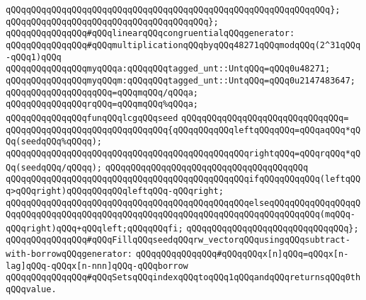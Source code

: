 \verb|qQQqqQQqqQQqqQQqqQQqqQQqqQQqqQQqqQQqqQQqqQQqqQQqqQQqqQQqqQQqqQQq};|\newline
\verb|qQQqqQQqqQQqqQQqqQQqqQQqqQQqqQQqqQQqqQQq};|\newline
\newline
\verb|qQQqqQQqqQQqqQQq#qQQqlinearqQQqcongruentialqQQqgenerator:|\newline
\verb|qQQqqQQqqQQqqQQq#qQQqmultiplicationqQQqbyqQQq48271qQQqmodqQQq(2^31qQQq-qQQq1)qQQq|\newline
\newline
\verb|qQQqqQQqqQQqqQQqmyqQQqa:qQQqqQQqtagged_unt::UntqQQq=qQQq0u48271;|\newline
\verb|qQQqqQQqqQQqqQQqmyqQQqm:qQQqqQQqtagged_unt::UntqQQq=qQQq0u2147483647;|\newline
\newline
\verb|qQQqqQQqqQQqqQQqqqQQq=qQQqmqQQq/qQQqa;|\newline
\verb|qQQqqQQqqQQqqQQqrqQQq=qQQqmqQQq%qQQqa;|\newline
\newline
\verb|qQQqqQQqqQQqqQQqfunqQQqlcgqQQqseed|\newline
\verb|qQQqqQQqqQQqqQQqqQQqqQQqqQQqqQQq=|\newline
\verb|qQQqqQQqqQQqqQQqqQQqqQQqqQQqqQQq{qQQqqQQqqQQqleftqQQqqQQq=qQQqaqQQq*qQQq(seedqQQq%qQQqq);|\newline
\verb|qQQqqQQqqQQqqQQqqQQqqQQqqQQqqQQqqQQqqQQqqQQqqQQqrightqQQq=qQQqrqQQq*qQQq(seedqQQq/qQQqq);|\newline
\verb|qQQqqQQqqQQqqQQqqQQqqQQqqQQqqQQqqQQqqQQq|\newline
\verb|qQQqqQQqqQQqqQQqqQQqqQQqqQQqqQQqqQQqqQQqqQQqqQQqifqQQqqQQqqQQq(leftqQQq>qQQqright)qQQqqQQqqQQqleftqQQq-qQQqright;|\newline
\verb|qQQqqQQqqQQqqQQqqQQqqQQqqQQqqQQqqQQqqQQqqQQqqQQqelseqQQqqQQqqQQqqQQqqQQqqQQqqQQqqQQqqQQqqQQqqQQqqQQqqQQqqQQqqQQqqQQqqQQqqQQqqQQqqQQq(mqQQq-qQQqright)qQQq+qQQqleft;qQQqqQQqfi;|\newline
\verb|qQQqqQQqqQQqqQQqqQQqqQQqqQQqqQQq};|\newline
\newline
\verb|qQQqqQQqqQQqqQQq#qQQqFillqQQqseedqQQqrw_vectorqQQqusingqQQqsubtract-with-borrowqQQqgenerator:|\newline
\verb|qQQqqQQqqQQqqQQq#qQQqqQQqx[n]qQQq=qQQqx[n-lag]qQQq-qQQqx[n-nnn]qQQq-qQQqborrow|\newline
\verb|qQQqqQQqqQQqqQQq#qQQqSetsqQQqindexqQQqtoqQQq1qQQqandqQQqreturnsqQQq0thqQQqvalue.|\newline
